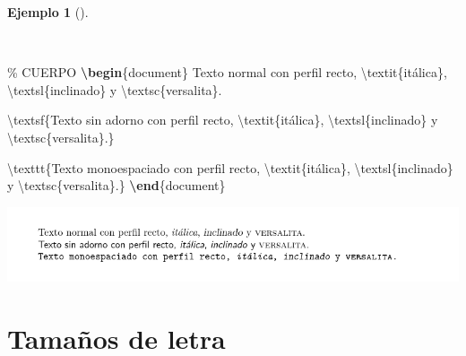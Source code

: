 \documentclass[
  a4paper,
]{scrreport}
\newenvironment{Shaded}{\begin{snugshade}}{\end{snugshade}}
\newcommand{\CommentTok}[1]{\textcolor[rgb]{0.37,0.37,0.37}{#1}}
\newcommand{\ExtensionTok}[1]{\textcolor[rgb]{0.00,0.23,0.31}{#1}}
\newcommand{\FunctionTok}[1]{\textcolor[rgb]{0.28,0.35,0.67}{#1}}
\newcommand{\KeywordTok}[1]{\textcolor[rgb]{0.00,0.23,0.31}{\textbf{#1}}}
\newcommand{\NormalTok}[1]{\textcolor[rgb]{0.00,0.23,0.31}{#1}}
\theoremstyle{definition}
\newtheorem{example}{Ejemplo}[chapter]
\theoremstyle{remark}
\begin{document}
\begin{example}[]\protect\hypertarget{exm-perfiles-letra}{}\label{exm-perfiles-letra}

~

\begin{Shaded}
\begin{Highlighting}[]
\CommentTok{\% CUERPO}
\KeywordTok{\textbackslash{}begin}\NormalTok{\{}\ExtensionTok{document}\NormalTok{\}}
\NormalTok{Texto normal con perfil recto, }\FunctionTok{\textbackslash{}textit}\NormalTok{\{itálica\}, }\FunctionTok{\textbackslash{}textsl}\NormalTok{\{inclinado\} y }
\FunctionTok{\textbackslash{}textsc}\NormalTok{\{versalita\}.}

\FunctionTok{\textbackslash{}textsf}\NormalTok{\{Texto sin adorno con perfil recto, }\FunctionTok{\textbackslash{}textit}\NormalTok{\{itálica\}, }
\FunctionTok{\textbackslash{}textsl}\NormalTok{\{inclinado\} y }\FunctionTok{\textbackslash{}textsc}\NormalTok{\{versalita\}.\}}

\FunctionTok{\textbackslash{}texttt}\NormalTok{\{Texto monoespaciado con perfil recto, }\FunctionTok{\textbackslash{}textit}\NormalTok{\{itálica\}, }
\FunctionTok{\textbackslash{}textsl}\NormalTok{\{inclinado\} y }\FunctionTok{\textbackslash{}textsc}\NormalTok{\{versalita\}.\}}
\KeywordTok{\textbackslash{}end}\NormalTok{\{}\ExtensionTok{document}\NormalTok{\}}
\end{Highlighting}
\end{Shaded}

\begin{tcolorbox}[enhanced jigsaw, colframe=quarto-callout-note-color-frame, opacityback=0, title={Salida}, bottomrule=.15mm, left=2mm, coltitle=black, arc=.35mm, leftrule=.75mm, colback=white, rightrule=.15mm, colbacktitle=quarto-callout-note-color!10!white, toprule=.15mm, breakable, opacitybacktitle=0.6, bottomtitle=1mm, toptitle=1mm, titlerule=0mm]

\includegraphics{img/formateo/perfiles-letra.png}

\end{tcolorbox}

\end{example}

\section{Tamaños de letra}\label{tamauxf1os-de-letra}
\end{document}
